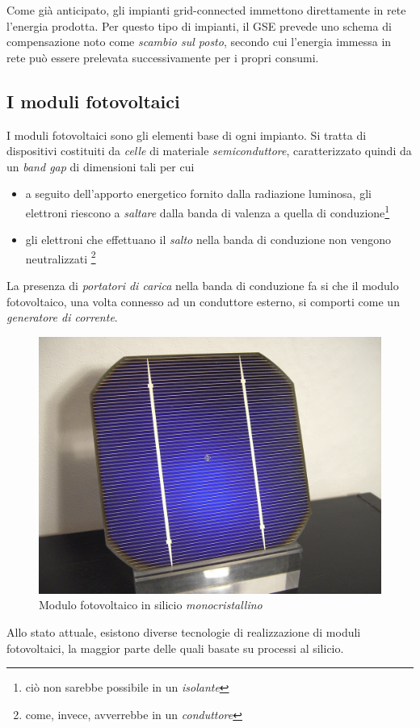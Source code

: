 %
Come gi\`a anticipato, gli impianti grid-connected immettono direttamente in rete 
l'energia prodotta. Per questo tipo di impianti, il GSE prevede uno schema di compensazione 
noto come \emph{scambio sul posto}\cite{scambioposto}, secondo cui l'energia immessa 
in rete pu\`o essere prelevata successivamente per i propri consumi.
%

%
\subsection{I moduli fotovoltaici}
I moduli fotovoltaici sono gli elementi base di ogni impianto. 
Si tratta di dispositivi costituiti da \emph{celle} di materiale 
\emph{semiconduttore}, caratterizzato quindi da un \emph{band gap} 
di dimensioni tali per cui 
%
\begin{itemize}
\item a seguito dell'apporto energetico fornito dalla radiazione luminosa, 
      gli elettroni riescono a \emph{saltare} dalla banda di valenza a 
      quella di conduzione\footnote{ci\`o non sarebbe possibile in un \emph{isolante}}
%
\item gli elettroni che effettuano il \emph{salto} nella banda di conduzione 
      non vengono neutralizzati
      \footnote{come, invece, avverrebbe in un \emph{conduttore}}
\end{itemize}
%
La presenza di \emph{portatori di carica} nella banda di conduzione 
fa si che il modulo fotovoltaico, una volta connesso ad un conduttore 
esterno, si comporti come un \emph{generatore di corrente}\cite{bellini09}.
%
\begin{figure}[!h]
\centering
\includegraphics[width=350pt]{img/modulo-fotovoltaico.jpg}
\caption{Modulo fotovoltaico in silicio \emph{monocristallino}}
\end{figure}
%
Allo stato attuale, esistono diverse tecnologie di realizzazione di 
moduli fotovoltaici, la maggior parte delle quali basate su processi 
al silicio.
%

